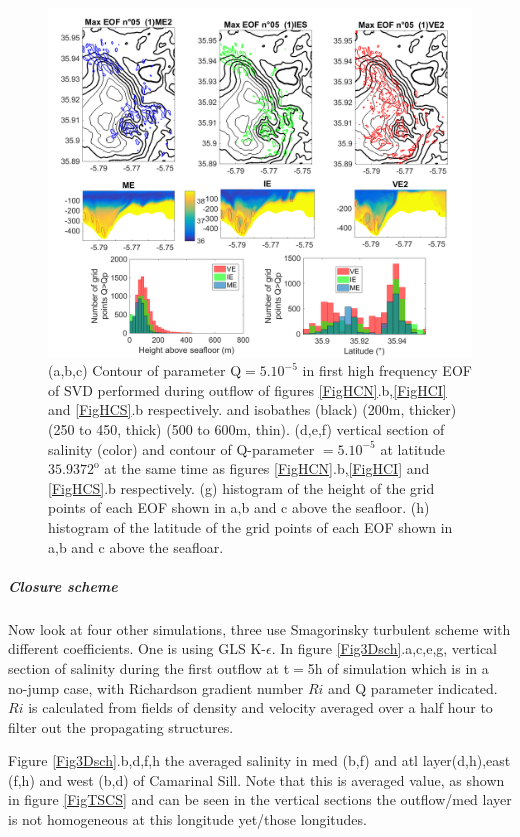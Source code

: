 \begin{figure}[!h]
 \includegraphics[width=\textwidth]{./GBR3D/EOF5_MIV_2D.png}
 \caption {(a,b,c) Contour of parameter Q$=5.10^{-5}$ in first high frequency EOF of SVD performed during outflow of figures \ref{FigHCN}.b,\ref{FigHCI} and \ref{FigHCS}.b respectively. and isobathes (black) (200m, thicker)  (250 to 450, thick) (500 to 600m, thin). (d,e,f) vertical section of salinity (color) and contour of Q-parameter $=5.10^{-5}$ at latitude $35.9372^\text{o}$ at the same time as figures \ref{FigHCN}.b,\ref{FigHCI} and \ref{FigHCS}.b respectively. (g) histogram of the height of the grid points of each EOF shown in a,b and c above the seafloor. (h) histogram of the latitude of the grid points of each EOF shown in a,b and c above the seafloar. }
 \label{FigEOFMIV}
\end{figure}


\subparagraph{Closure scheme}

Now look at four other simulations, three use Smagorinsky turbulent scheme with different coefficients. One is using GLS K-$\epsilon$. In figure \ref{Fig3Dsch}.a,c,e,g, vertical section of salinity during the first outflow at t$=$5h of simulation which is in a no-jump case, with Richardson gradient number $Ri$ and Q parameter indicated. $Ri$ is calculated from fields of density and velocity averaged over a half hour to filter out the propagating structures.

Figure \ref{Fig3Dsch}.b,d,f,h the averaged salinity in med (b,f) and atl layer(d,h),east (f,h) and west (b,d) of Camarinal Sill. Note that this is averaged value, as shown in figure \ref{FigTSCS} and can be seen in the vertical sections the outflow/med layer is not homogeneous at this longitude yet/those longitudes.


